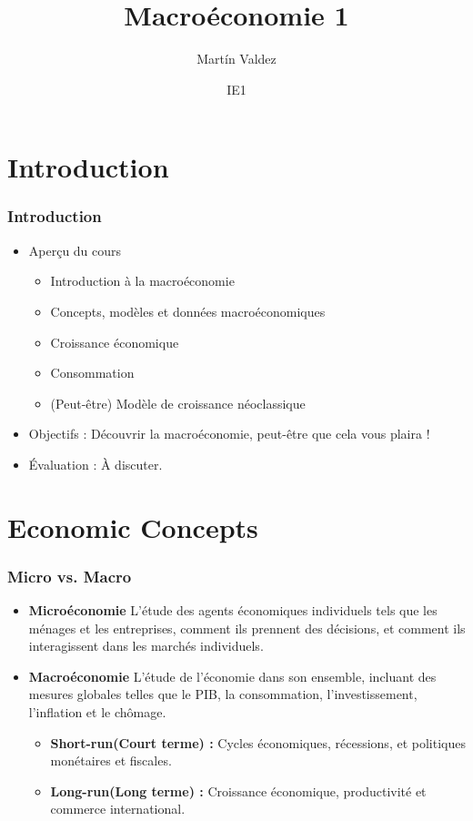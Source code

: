 \documentclass{beamer}
\title{Macroéconomie 1}
\author{Mart\'in Valdez}
\date{IE1}
\begin{document}
\begin{frame}
\titlepage
\end{frame}



\section{Introduction}
\begin{frame}
    \frametitle{Introduction}
    \begin{itemize}
        \item Aperçu du cours
        \begin{itemize}
            \item Introduction à la macroéconomie
            \item Concepts, modèles et données macroéconomiques
            \item Croissance économique
            \item Consommation
            \item (Peut-être) Modèle de croissance néoclassique
        \end{itemize}
        \item Objectifs : Découvrir la macroéconomie, peut-être que cela vous plaira !
        \item Évaluation : À discuter.
    \end{itemize}
\end{frame}
\section{Economic Concepts}
\begin{frame}
\frametitle{Micro vs. Macro}
\begin{itemize}
    \item \textbf{Microéconomie}
    L'étude des agents économiques individuels tels que les ménages et les entreprises,
    comment ils prennent des décisions, et comment ils interagissent dans les marchés individuels.
    \pause
    \item \textbf{Macroéconomie}
    L'étude de l'économie dans son ensemble, incluant des mesures globales telles que
    le PIB, la consommation, l'investissement, l'inflation et le chômage.
    \begin{itemize}
        \item \textbf{Short-run(Court terme) :} Cycles économiques, récessions, et politiques monétaires et fiscales.\pause
        \item \textbf{Long-run(Long terme) :} Croissance économique, productivité et commerce international.
    \end{itemize}
\end{itemize}
\end{frame}
\end{document}

